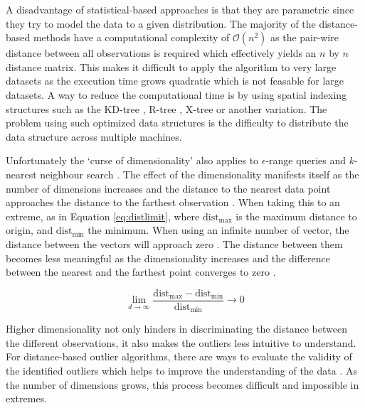 A disadvantage of statistical-based approaches is that they are parametric since they try to model the data to a given distribution. The majority of the distance-based methods have a computational complexity of $\mathcal{O}(n^{2})$ as the pair-wire distance between all observations is required which effectively yields an $n$ by $n$ distance matrix. This makes it difficult to apply the algorithm to very large datasets as the execution time grows quadratic which is not feasable for large datasets. A way to reduce the computational time is by using spatial indexing structures such as the KD-tree \cite{Bentley:1975:MBS:361002.361007}, R-tree \cite{Guttman:1984:RDI:971697.602266}, X-tree \cite{Berchtold:1996:XIS:645922.673502} or another variation. The problem using such optimized data structures is the difficulty to distribute the data structure across multiple machines.

Unfortunately the `curse of dimensionality' also applies to $\epsilon$-range queries and $k$-nearest neighbour search \cite{citeulike:12369622}. The effect of the dimensionality manifests itself as the number of dimensions increases and the distance to the nearest data point approaches the distance to the farthest observation \cite{Beyer99whenis}. When taking this to an extreme, as in Equation \ref{eq:distlimit}, where $\text{dist}_{\text{max}}$ is the maximum distance to origin, and $\text{dist}_{\text{min}}$ the minimum. When using an infinite number of vector, the distance between the vectors will approach zero \cite{Hinneburg:2000:NNH:645926.671675}. The distance between them becomes less meaningful as the dimensionality increases and the difference between the nearest and the farthest point converges to zero \cite{meaningnearestneighbour,Hinneburg:2000:NNH:645926.671675,Aggarwal01onthe}.

\begin{equation}
\lim_{d \to \infty} \frac{\text{dist}_{\text{max}} - \text{dist}_{\text{min}}}{\text{dist}_{\text{min}}} \to 0
\label{eq:distlimit}
\end{equation}

Higher dimensionality not only hinders in discriminating the distance between the different observations, it also makes the outliers less intuitive to understand. For distance-based outlier algorithms, there are ways to evaluate the validity of the identified outliers which helps to improve the understanding of the data \cite{Knorr:1999:FIK:645925.671529}. As the number of dimensions grows, this process becomes difficult and impossible in extremes.

